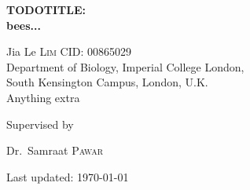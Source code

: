 \documentclass[12pt]{article}
\renewenvironment{abstract}
 {\hspace{.8cm}
  {\bfseries\huge\abstractname}
  \list{}{
    \setlength{\leftmargin}{.95cm}%
    \setlength{\rightmargin}{\leftmargin}%
  }%
  \item\relax}
 {\endlist}
\begin{document}
\begin{titlepage}
	\centering
	\vspace*{\fill}
	{\huge\bfseries TODOTITLE: \\ bees...\par}
	\vspace{2cm}
	{\Large Jia Le \textsc{Lim} {    }  CID: 00865029}
	\\ 	\vspace{0.5cm}
	{Department of Biology, Imperial College London, \\South Kensington Campus, London, U.K.} \\ \vspace{0.5cm}
	{Anything extra} \\
	\vspace*{\fill}
	{\large Supervised by\par
	Dr.~Samraat \textsc{Pawar}}
	\vfill
	{\large Last updated: \today\par}
\end{titlepage}

%
\newpage
{}
\vspace*{\fill}
\tableofcontents 
\vspace*{\fill} 
\thispagestyle{empty}

\doublespacing

%
%

\newpage
\pagestyle{fancy}
\fancyhf{}
\renewcommand{\headrulewidth}{0pt}

\end{document}

